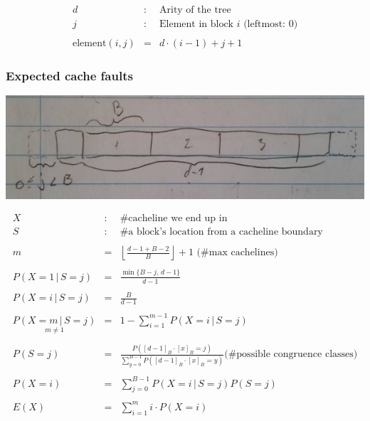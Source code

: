 \begin{eqnarray*}
d & : & \textrm{Arity of the tree} \\
j & : & \textrm{Element in block $i$ (leftmost: $0$)} \\
\\
\mathrm{element}(i, j) & = & d\cdot (i - 1) + j + 1
\end{eqnarray*}

\subsubsection*{Expected cache faults}



\includegraphics[width=1\textwidth]{blocks}

\begin{eqnarray*}
X & : & \textrm{\#cacheline we end up in}\\
S & : & \textrm{\#a block's location from a cacheline boundary}\\
\\
m & = & \left\lfloor \frac{d-1+B-2}{B}\right\rfloor +1\textrm{ (\#max cachelines)}\\
\\
P(X=1\,|\, S=j) & = & \frac{\min\{B-j,\, d-1\}}{d-1}\\
\\
P(X=i\,|\, S=j) & = & \frac{B}{d-1}\\
\\
\underset{m\neq1}{P(X=m\,|\, S=j)} & = & 1-\sum_{i=1}^{m-1}P(X=i\,|\, S=j)\\
\\ %
P(S=j) & = & \frac{P([d-1]_{B}\cdot[x]_{B}=j)}{\sum_{y=0}^{B-1}P([d-1]_{B}\cdot[x]_{B}=y)}\textrm{(\#possible congruence classes)}\\
\\
P(X=i) & = & \sum_{j=0}^{B-1}P(X=i\,|\, S=j)P(S=j)\\
\\
E(X) & = & \sum_{i=1}^{m}i\cdot P(X=i)
\end{eqnarray*}

